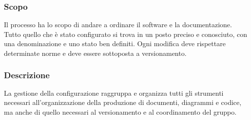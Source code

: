 \subsubsection{Scopo}
Il processo ha lo scopo di andare a ordinare il software e la documentazione. Tutto quello che è stato configurato si trova in un posto preciso e conosciuto, con una denominazione e uno stato ben definiti. Ogni modifica deve rispettare determinate norme e deve essere sottoposta a versionamento.
\subsubsection{Descrizione}
La gestione della configurazione raggruppa e organizza tutti gli strumenti necessari all'organizzazione della produzione di documenti, diagrammi e codice, ma anche di quello necessari al versionamento e al coordinamento del gruppo.
